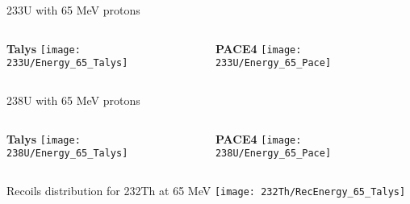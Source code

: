 \documentclass[10pt]{beamer}
\begin{document}
\begin{frame}{233U with 65 MeV protons}
	\begin{columns}
		\begin{column}{0.5\textwidth}
			\begin{overlayarea}{\textwidth}{\textheight}
				\centering	    
			   	\vspace{0.05\textheight}
			   	\textbf{Talys}
			   	\texttt{[image: 233U/Energy\_65\_Talys]}\\
			\end{overlayarea}
		\end{column}
		\begin{column}{0.5\textwidth}
			\begin{overlayarea}{\textwidth}{\textheight}
				\centering	    
			   	\vspace{0.05\textheight}
			   	\textbf{PACE4}
				\texttt{[image: 233U/Energy\_65\_Pace]}
			\end{overlayarea}
		\end{column}
	\end{columns}
\end{frame}

\begin{frame}{238U with 65 MeV protons}
	\begin{columns}
		\begin{column}{0.5\textwidth}
			\begin{overlayarea}{\textwidth}{\textheight}
				\centering	    
			   	\vspace{0.05\textheight}
			   	\textbf{Talys}
			   	\texttt{[image: 238U/Energy\_65\_Talys]}\\
			\end{overlayarea}
		\end{column}
		\begin{column}{0.5\textwidth}
			\begin{overlayarea}{\textwidth}{\textheight}
				\centering	    
			   	\vspace{0.05\textheight}
			   	\textbf{PACE4}
				\texttt{[image: 238U/Energy\_65\_Pace]}
			\end{overlayarea}
		\end{column}
	\end{columns}
\end{frame}

\begin{frame}{Recoils distribution for 232Th at 65 MeV}
	\centering
	\vspace{-0.1\textheight}
	\texttt{[image: 232Th/RecEnergy\_65\_Talys]}\\
\end{frame}
\end{document}
